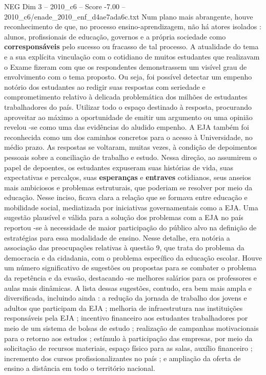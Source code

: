 \begin{textsample}{NEG Dim 3 – 2010\_c6 – Score -7.00 – 2010\_c6/enade\_2010\_enf\_d4ae7ada6c.txt}
Num plano mais abrangente, houve reconhecimento de que, no processo ensino-aprendizagem, não há atores isolados : alunos, profissionais de educação, governos e a própria sociedade como \textbf{corresponsáveis} pelo sucesso ou fracasso de tal processo.
A atualidade do tema e a sua explícita vinculação com o cotidiano de muitos estudantes que realizavam o Exame fizeram com que os respondentes demonstrassem um visível grau de envolvimento com o tema proposto.
Ou seja, foi possível detectar um empenho notório dos estudantes ao redigir suas respostas com seriedade e comprometimento relativo à delicada problemática dos milhões de estudantes trabalhadores do país.
Utilizar todo o espaço destinado à resposta, procurando aproveitar ao máximo a oportunidade de emitir um argumento ou uma opinião revelou -se como uma das evidências do aludido empenho.
A EJA também foi reconhecida como um dos caminhos concretos para o acesso à Universidade, no médio prazo.
As respostas se voltaram, muitas vezes, à condição de depoimentos pessoais sobre a conciliação de trabalho e estudo.
Nessa direção, ao assumirem o papel de depoentes, os estudantes expuseram suas histórias de vida, suas expectativas e percalços, suas \textbf{esperanças} e \textbf{entraves} cotidianos, seus anseios mais ambiciosos e problemas estruturais, que poderiam se resolver por meio da educação.
Nesse inciso, ficava clara a relação que se formava entre educação e mobilidade social, mediatizada por iniciativas governamentais como a EJA.
Uma sugestão plausível e válida para a solução dos problemas com a EJA no país reportou -se à necessidade de maior participação do público alvo na definição de estratégias para essa modalidade de ensino.
Nesse detalhe, era notória a associação das preocupações relativas à questão 9, que trata do problema da democracia e da cidadania, com o problema específico da educação escolar.
Houve um número significativo de sugestões ou propostas para se combater o problema da repetência e da evasão, destacando -se melhores salários para os professores e aulas mais dinâmicas.
A lista dessas sugestões, contudo, era bem mais ampla e diversificada, incluindo ainda : a redução da jornada de trabalho dos jovens e adultos que participam da EJA ; melhoria de infraestrutura nas instituições responsáveis pela EJA ; incentivo financeiro aos estudantes trabalhadores por meio de um sistema de bolsas de estudo ; realização de campanhas motivacionais para o retorno aos estudos ; estímulo à participação das empresas, por meio da solicitação de recursos materiais, espaço físico para as salas, auxílio financeiro ; incremento dos cursos profissionalizantes no país ; e ampliação da oferta de ensino a distância em todo o território nacional.

\end{textsample}
